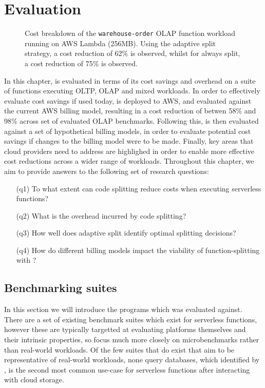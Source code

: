 \chapter{Evaluation}
\label{chap:eval}
\begin{figure}
    \begin{center}
        
    \end{center}
    \caption{Cost breakdown of the \texttt{warehouse-order} OLAP function workload running on AWS Lambda (256MB). Using the adaptive split strategy, a cost reduction of 62\% is observed, whilst for always split, a cost reduction of 75\% is observed.}
\end{figure}

In this chapter, \faaas{} is evaluated in terms of its cost savings and overhead on a suite of \faas{} functions executing OLTP, OLAP and mixed workloads. In order to effectively evaluate cost savings if used today, \faas{} is deployed to AWS, and evaluated against the current AWS billing model, resulting in a cost reduction of betwen 58\% and 98\% across set of evaluated OLAP benchmarks. Following this, \faaas{} is then evaluated against a set of hypothetical billing models, in order to evaluate potential cost savings if changes to the billing model were to be made. Finally, key areas that cloud providers need to address are highlighed in order to enable more effective cost reductions across a wider range of \faas{} workloads. Throughout this chapter, we aim to provide answers to the following set of research questions:

\begin{itemize}
    \item[(q1)] To what extent can code splitting reduce costs when executing serverless functions?
    \item[(q2)] What is the overhead incurred by code splitting?
    \item[(q3)] How well does adaptive split identify optimal splitting decisions?
    \item[(q4)] How do different \faas{} billing models impact the viability of function-splitting with \faaas{}?
\end{itemize}

\section{Benchmarking suites}
In this section we will introduce the programs which \faaas{} was evaluated against. There are a set of existing benchmark suites which exist for serverless functions, however these are typically targetted at evaluating \faas{} platforms themselves and their intrinsic properties, so focus much more closely on microbenchmarks rather than real-world workloads. Of the few suites that do exist that aim to be representative of real-world workloads, none query databases, which identified by \cite{eismannReviewServerlessUse2020}, is the second most common use-case for serverless functions after interacting with cloud storage.

